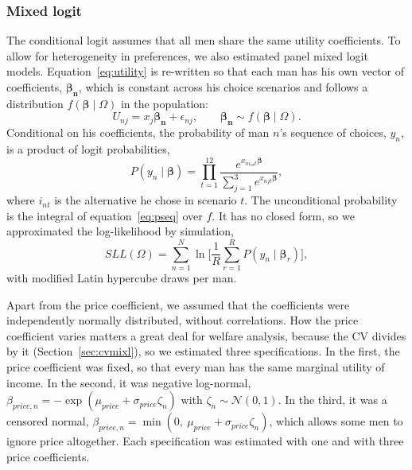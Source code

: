 \documentclass[11pt]{article}
\numberwithin{equation}{section}\numberwithin{figure}{section}\numberwithin{table}{section}
\begin{document}
\subsubsection{Mixed logit}
The conditional logit assumes that all men share the same utility coefficients. To allow for heterogeneity in preferences, we also estimated panel mixed logit models. Equation~\ref{eq:utility} is re-written so that each man has his own vector of coefficients, $\boldsymbol{\beta_n}$, which is constant across his choice scenarios and follows a distribution $f(\boldsymbol{\beta} \mid \Omega)$ in the population:
\begin{equation}\label{eq:mixl}
U_{nj} = x_{j}\boldsymbol{\beta_n} + \epsilon_{nj}, \qquad \boldsymbol{\beta_n} \sim f(\boldsymbol{\beta} \mid \Omega).
\end{equation}
Conditional on his coefficients, the probability of man $n$'s sequence of choices, $y_n$, is a product of logit probabilities,
\begin{equation}\label{eq:pseq}
P(y_n \mid \boldsymbol{\beta}) = \prod_{t=1}^{12} \frac{e^{x_{n i_{nt} t}\boldsymbol{\beta}}}{\sum_{j=1}^{3} e^{x_{njt}\boldsymbol{\beta}}},
\end{equation}
where $i_{nt}$ is the alternative he chose in scenario $t$. The unconditional probability is the integral of equation~\ref{eq:pseq} over $f$. It has no closed form, so we approximated the log-likelihood by simulation,\cite{RN89}
\begin{equation}\label{eq:sll}
SLL(\Omega) = \sum_{n=1}^{N} \ln \Bigg[\frac{1}{R}\sum_{r=1}^{R} P(y_n \mid \boldsymbol{\beta}_r)\Bigg],
\end{equation}
with \mmcMXdraws{} modified Latin hypercube draws per man.\cite{RN265}

Apart from the price coefficient, we assumed that the coefficients were independently normally distributed, without correlations. How the price coefficient varies matters a great deal for welfare analysis, because the CV divides by it (Section~\ref{sec:cvmixl}), so we estimated three specifications. In the first, the price coefficient was fixed, so that every man has the same marginal utility of income. In the second, it was negative log-normal, $\beta_{price,n} = -\exp(\mu_{price} + \sigma_{price}\zeta_n)$ with $\zeta_n \sim \mathcal{N}(0,1)$. In the third, it was a censored normal, $\beta_{price,n} = \min(0,\ \mu_{price} + \sigma_{price}\zeta_n)$, which allows some men to ignore price altogether. Each specification was estimated with one and with three price coefficients.
\end{document}
